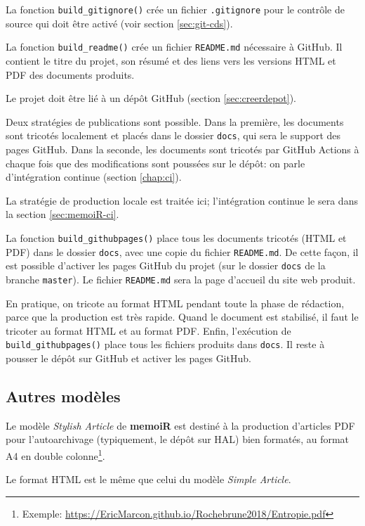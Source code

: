 \documentclass[
  12pt,
  french,
  a4paper,
  extrafontsizes,onecolumn,openright
  ]{memoir}
\begin{document}
La fonction \texttt{build\_gitignore()} crée un fichier \texttt{.gitignore} pour le contrôle de source qui doit être activé (voir section \ref{sec:git-cds}).

La fonction \texttt{build\_readme()} crée un fichier \texttt{README.md} nécessaire à GitHub.
Il contient le titre du projet, son résumé et des liens vers les versions HTML et PDF des documents produits.

Le projet doit être lié à un dépôt GitHub (section \ref{sec:creerdepot}).

Deux stratégies de publications sont possible.
Dans la première, les documents sont tricotés localement et placés dans le dossier \texttt{docs}, qui sera le support des pages GitHub.
Dans la seconde, les documents sont tricotés par GitHub Actions à chaque fois que des modifications sont poussées sur le dépôt: on parle d'intégration continue (section \ref{chap:ci}).

La stratégie de production locale est traitée ici; l'intégration continue le sera dans la section \ref{sec:memoiR-ci}.

La fonction \texttt{build\_githubpages()} place tous les documents tricotés (HTML et PDF) dans le dossier \texttt{docs}, avec une copie du fichier \texttt{README.md}.
De cette façon, il est possible d'activer les pages GitHub du projet (sur le dossier \texttt{docs} de la branche \texttt{master}).
Le fichier \texttt{README.md} sera la page d'accueil du site web produit.

En pratique, on tricote au format HTML pendant toute la phase de rédaction, parce que la production est très rapide.
Quand le document est stabilisé, il faut le tricoter au format HTML et au format PDF.
Enfin, l'exécution de \texttt{build\_githubpages()} place tous les fichiers produits dans \texttt{docs}.
Il reste à pousser le dépôt sur GitHub et activer les pages GitHub.

\hypertarget{autres-moduxe8les}{%
\subsection{Autres modèles}\label{autres-moduxe8les}}

Le modèle \emph{Stylish Article} de \textbf{memoiR} est destiné à la production d'articles PDF pour l'autoarchivage (typiquement, le dépôt sur HAL) bien formatés, au format A4 en double colonne\footnote{Exemple: \url{https://EricMarcon.github.io/Rochebrune2018/Entropie.pdf}}.

Le format HTML est le même que celui du modèle \emph{Simple Article}.
\end{document}
